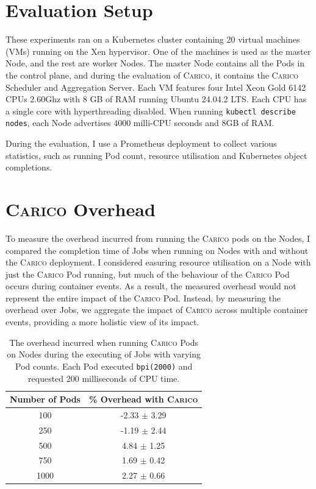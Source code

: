 \section{Evaluation Setup}
These experiments ran on a Kubernetes cluster containing 20 virtual machines
(VMs) running on the Xen hypervisor. One of the machines is used as the master
Node, and the rest are worker Nodes. The master Node contains all the Pods in
the control plane, and during the evaluation of \textsc{Carico}, it contains the \textsc{Carico}
Scheduler and Aggregation Server. Each VM features four Intel Xeon Gold 6142
CPUs \@ 2.60Ghz with 8 GB of RAM running Ubuntu 24.04.2 LTS. Each CPU has a
single core with hyperthreading disabled. When running \texttt{kubectl describe
nodes}, each Node advertises $4000$ milli-CPU seconds and 8GB of RAM.

During the evaluation, I use a Prometheus deployment \cite{} to collect various
statistics, such as running Pod count, resource utilisation and Kubernetes
object completions.

\section{\textsc{Carico} Overhead}
\label{sec:eval-overhead}
To measure the overhead incurred from running the \textsc{Carico} pods on the Nodes, I
compared the completion time of Jobs when running on Nodes with and without the
\textsc{Carico} deployment. I considered easuring resource utilisation on a Node with
just the \textsc{Carico} Pod running, but much of the behaviour of the
\textsc{Carico} Pod occurs during container events. As a result, the measured overhead
would not represent the entire impact of the \textsc{Carico} Pod. Instead, by measuring
the overhead over Jobs, we aggregate the impact of \textsc{Carico} across multiple
container events, providing a more holistic view of its impact.

\begin{table}[H]
\centering
    \begin{tabular}{|c|c|}
    \hline
    \textbf{Number of Pods} & \textbf{\% Overhead with \textsc{Carico}} \\
    \hline
        100 & -2.33 $\pm$ 3.29 \\
        250 & -1.19 $\pm$ 2.44 \\
        500 & 4.84  $\pm$ 1.25 \\
        750 & 1.69  $\pm$ 0.42 \\
        1000 & 2.27  $\pm$ 0.66 \\
    \hline
    \end{tabular}
    \label{tab:overhead}
    \caption{The overhead incurred when running \textsc{Carico} Pods on Nodes during the
    executing of Jobs with varying Pod counts. Each Pod executed
    \texttt{bpi(2000)} and requested 200 milliseconds of CPU time.}
\end{table}

